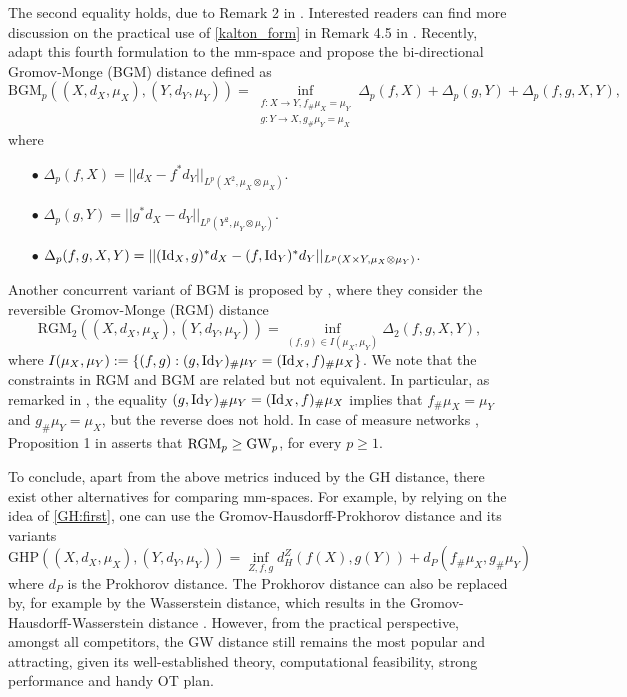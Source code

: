 The second equality holds, due to Remark 2 in \citep{Memoli05}. Interested readers can find
more discussion on the practical use of \eqref{kalton_form} in Remark 4.5 in \citep{Memoli11b}.
Recently, \citep{Zhang21} adapt this fourth formulation to the mm-space and propose
the bi-directional Gromov-Monge (BGM) distance defined as
\begin{equation}
  \text{BGM}_p((X, d_X, \mu_X), (Y, d_Y, \mu_Y)) =
  \inf_{\substack{f: X \to Y, f_{\#}\mu_X = \mu_Y \\ g: Y \to X, g_{\#} \mu_Y = \mu_X}}
  \Delta_{p}(f,X) + \Delta_{p}(g,Y) + \Delta_{p}(f,g, X, Y),
\end{equation}
where
\begin{itemize}
  \item[$\bullet$] $\Delta_{p}(f, X) = || d_X - f^* d_Y ||_{L^p(X^2, \mu_X \otimes \mu_X)}$.
  \item[$\bullet$] $\Delta_{p}(g, Y) = || g^* d_X - d_Y ||_{L^p(Y^2, \mu_Y \otimes \mu_Y)}$.
  \item[$\bullet$] $\Delta_{p}(f,g, X, Y) = || (\text{Id}_X, g)^*d_X - (f, \text{Id}_Y)^*d_Y ||_{L^p(X \times Y, \mu_X \otimes \mu_Y)}$.
\end{itemize}
Another concurrent variant of BGM is proposed by \citep{Hur21},
where they consider the reversible Gromov-Monge (RGM) distance
\begin{equation}
  \text{RGM}_2((X, d_X, \mu_X), (Y, d_Y, \mu_Y)) =
  \inf_{(f,g) \in I(\mu_X, \mu_Y)} \Delta_2(f,g, X, Y),
\end{equation}
where $I(\mu_X, \mu_Y) := \{(f, g): (g, \text{Id}_Y)_{\#} \mu_Y = (\text{Id}_X, f)_{\#} \mu_X \}$.
We note that the constraints in RGM and BGM are related but not equivalent. In particular,
as remarked in \citep{Hur21}, the equality $(g, \text{Id}_Y)_{\#} \mu_Y = (\text{Id}_X, f)_{\#} \mu_X$
implies that $ f_{\#}\mu_X = \mu_Y$ and $g_{\#} \mu_Y = \mu_X$, but the reverse does not hold.
In case of measure networks \citep{Chowdhury19}, Proposition 1 in \citep{Hur21} asserts that
$\text{RGM}_p \geq \text{GW}_p$, for every $p \geq 1$.

To conclude, apart from the above metrics induced by the GH distance, there exist other
alternatives for comparing mm-spaces. For example, by relying on the idea of \eqref{GH:first},
one can use the Gromov-Hausdorff-Prokhorov distance \citep{Villani08} and
its variants \citep{Abraham13,Miermont09}
\begin{equation}
  \text{GHP}((X, d_X, \mu_X), (Y, d_Y, \mu_Y)) =
  \inf_{Z, f, g} d_H^Z(f(X), g(Y)) + d_P(f_{\#} \mu_X, g_{\#} \mu_Y)
\end{equation}
where $d_P$ is the Prokhorov distance. The Prokhorov distance can also be replaced by,
for example by the Wasserstein distance, which results in the
Gromov-Hausdorff-Wasserstein distance \citep{Villani08}. However, from the practical perspective,
amongst all competitors, the GW distance still remains the most popular and attracting,
given its well-established theory, computational feasibility, strong performance and
handy OT plan.

